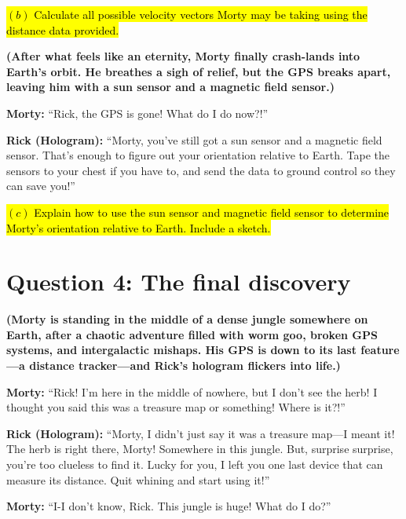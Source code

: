 \documentclass[a4paper, 12pt]{exam}
\begin{document}
\bigskip

\hl{$(b)$ Calculate all possible velocity vectors Morty may be taking using the distance data provided.}

\bigskip

\noindent \textbf{(After what feels like an eternity, Morty finally crash-lands into Earth’s orbit. He breathes a sigh of relief, but the GPS breaks apart, leaving him with a sun sensor and a magnetic field sensor.)} 

\bigskip

\noindent \textbf{Morty:} “Rick, the GPS is gone! What do I do now?!” 

\bigskip

\noindent \textbf{Rick (Hologram):} “Morty, you’ve still got a sun sensor and a magnetic field sensor. That’s enough to figure out your orientation relative to Earth. Tape the sensors to your chest if you have to, and send the data to ground control so they can save you!”

\bigskip

\hl{$(c)$ Explain how to use the sun sensor and magnetic field sensor to determine Morty's orientation relative to Earth. Include a sketch.}	
	
\pagebreak

\section*{Question 4: The final discovery}

\noindent \textbf{(Morty is standing in the middle of a dense jungle somewhere on Earth, after a chaotic adventure filled with worm goo, broken GPS systems, and intergalactic mishaps. His GPS is down to its last feature—a distance tracker—and Rick’s hologram flickers into life.)}

\bigskip
\noindent \textbf{Morty:} “Rick! I’m here in the middle of nowhere, but I don’t see the herb! I thought you said this was a treasure map or something! Where is it?!” \bigskip

\noindent \textbf{Rick (Hologram):} “Morty, I didn’t just say it was a treasure map—I meant it! The herb is right there, Morty! Somewhere in this jungle. But, surprise surprise, you’re too clueless to find it. Lucky for you, I left you one last device that can measure its distance. Quit whining and start using it!” \bigskip

\noindent \textbf{Morty:} “I-I don’t know, Rick. This jungle is huge! What do I do?” \bigskip
\end{document}
